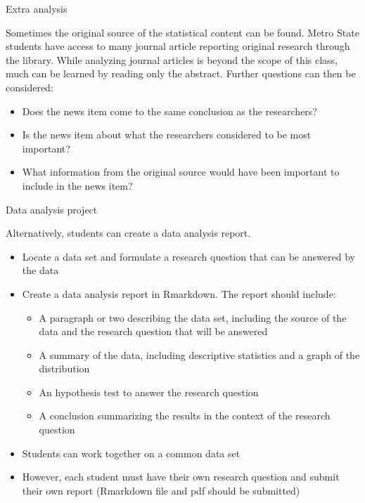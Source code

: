 \documentclass[xcolor=table, aspectratio=169, bigger]{beamer}
\begin{document}
\begin{frame}{Extra analysis}
\begin{block}{}
Sometimes the original source of the statistical content can be found. Metro State students have access to many journal article reporting original research through the library. While analyzing journal articles is beyond the scope of this class, much can be learned by reading only the abstract. Further questions can then be considered:
\begin{itemize}
\item Does the news item come to the same conclusion as the researchers?
\item Is the news item about what the researchers considered to be most important?
\item What information from the original source would have been important to include in the news item?
\end{itemize}
\end{block}
\end{frame}

\begin{frame}{Data analysis project}
\begin{block}{}
Alternatively, students can create a data analysis report.

\begin{itemize}
\item Locate a data set and formulate a research question that can be answered by the data
\item Create a data analysis report in Rmarkdown. The report should include:
\begin{itemize}
\item A paragraph or two describing the data set, including the source of the data and the research question that will be answered
\item A summary of the data, including descriptive statistics and a graph of the distribution
\item An hypothesis test to answer the research question
\item A conclusion  summarizing the results in the context of the research question
\end{itemize} 
\item Students can work together on a common data set
\item However, each student must have their own research question and submit their own report (Rmarkdown file and pdf should be submitted)
\end{itemize}
\end{block}
\end{frame}
\end{document}
